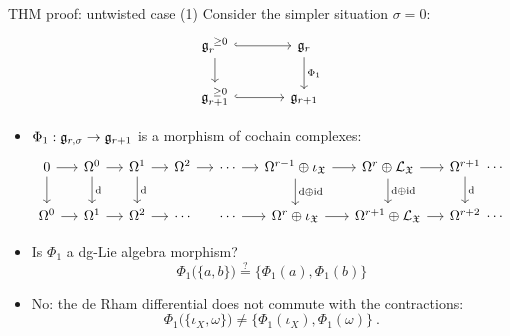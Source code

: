 \documentclass[beamer,10pt]{standalone}
\begin{document}
\begin{frame}{THM proof: untwisted case (1)}
	Consider the simpler situation $\sigma=0$:
	\begin{displaymath}
		\begin{tikzcd}[ampersand replacement=\&, column sep = large]
			\g_{r}^{~\geq 0} \ar[r,hook] \ar[d, ]
			\& \g_{r} \ar[d,"\Phi_1"]
			\\
			\g_{r+1}^{~\geq 0} \ar[r,hook] \& \g_{r+1}
		\end{tikzcd}
	\end{displaymath}
	\vfill \pause

	\begin{itemize}[<+-|@alert@+>]
		\item $\Phi_1:\mathfrak{g}_{r,\sigma}\to \mathfrak{g}_{r+1}$ is a morphism of cochain complexes:
		\begin{displaymath}
		\begin{tikzcd}[ampersand replacement=\&, column sep = small]
			0\ar[r]\ar[d] \&
			\Omega^0 \ar[r] \ar[d,"\d"] \&
			\Omega^1 \ar[r] \ar[d,"\d"] \&
			\Omega^2 \ar[r] \&
			\cdots \ar[r] \&
			\Omega^{r-1}\oplus \iota_{\X} \ar[d,"\d\oplus \id"] \ar[r] \&
			\Omega^{r}\oplus \Lie_{\X} \ar[r]\ar[d,"\d\oplus\id"] \&
			\Omega^{r+1} \ar[d,"\d"] \ar[r,phantom,"\cdots"] \& \phantom{.}
			\\
			\Omega^{0} \ar[r] \&
			\Omega^{1} \ar[r] \&
			\Omega^{2} \ar[r] \&
			\cdots \& \cdots \ar[r] \&
			\Omega^{r}\oplus\iota_{\X} \ar[r] \&
			\Omega^{r+1}\oplus \Lie_{\X} \ar[r] \&
			\Omega^{r+2} \ar[r,phantom,"\cdots"]  \& \phantom{.}
		\end{tikzcd}
		\end{displaymath}
		\vfill

		\item Is $\Phi_1$ a dg-Lie algebra morphism?
			$$ \Phi_1\big(\lbrace a, b \rbrace\big) \overset{?}{=} \big\lbrace \Phi_1(a), \Phi_1(b) \big\rbrace$$
		\vfill

		\item 	No: the de Rham differential does not commute with the contractions:
		$$ \Phi_1\big(\lbrace \iota_X, \omega \rbrace\big) \neq \big\lbrace \Phi_1(\iota_X), \Phi_1(\omega)\big\rbrace~.$$
	\end{itemize}
\end{frame}
\note[itemize]
{
	\item  
	\item 
}
\end{document}
